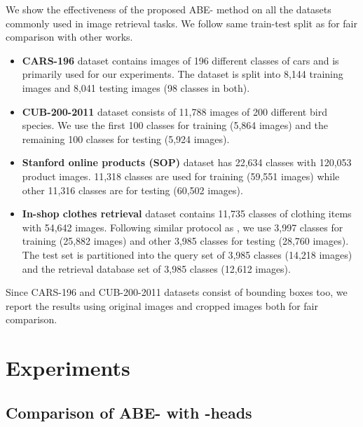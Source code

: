 \documentclass[runningheads]{llncs}
\begin{document}
We show the effectiveness of the proposed ABE- method on all the datasets commonly used in image retrieval tasks. We follow same train-test split as \cite{oh2016deep} for fair comparison with other works.
\begin{itemize}
\item \textbf{CARS-196} \cite{KrauseStarkDengFei-Fei_3DRR2013} dataset contains images of 196 different classes of cars and is primarily used for our experiments. The dataset is split into 8,144 training images and 8,041 testing images (98 classes in both).
\item \textbf{CUB-200-2011} \cite{WahCUB_200_2011} dataset consists of 11,788 images of 200 different bird species. We use the first 100 classes for training (5,864 images) and the remaining 100 classes for testing (5,924 images).
\item \textbf{Stanford online products (SOP)} \cite{oh2016deep} dataset has 22,634 classes with 120,053 product images. 11,318 classes are used for training (59,551 images) while other 11,316 classes are for testing (60,502 images).
\item \textbf{In-shop clothes retrieval} \cite{liu2016deepfashion} dataset contains 11,735 classes of clothing items with 54,642 images. Following similar protocol as \cite{oh2016deep}, we use 3,997 classes for training (25,882 images) and other 3,985 classes for testing (28,760 images). The test set is partitioned into the query set of 3,985 classes (14,218 images) and the retrieval database set of 3,985 classes (12,612 images).
\end{itemize}
Since CARS-196 and CUB-200-2011 datasets consist of bounding boxes too, we report the results using original images and cropped images both for fair comparison. \iffalse Following the approach in \cite{wu2017sampling}, for CARS196 cropped dataset, we scale the cropped images to 256x256; and for CUB200 cropped, we scale and pad the images such that their longer side is 256 pixels, keeping the aspect ratio fixed.\fi
 
\vspace{-2mm}
\section{Experiments} \label{experiments}
\vspace{-2mm}
\subsection{Comparison of ABE- with -heads}
\vspace{-2mm}
\end{document}
